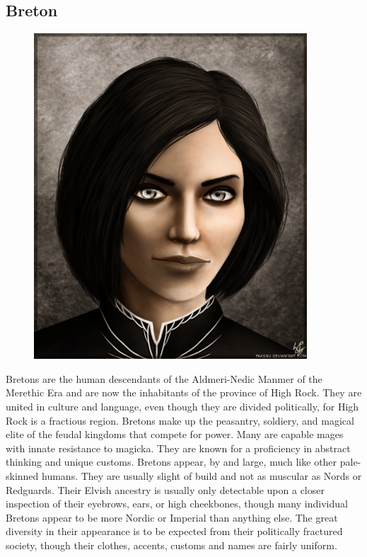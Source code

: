 \documentclass[12pt]{book}
\begin{document}
\subsection{Breton}
\begin{figure}
	\includegraphics[width=\textwidth]{Breton.png}
\end{figure}

Bretons are the human descendants of the Aldmeri-Nedic Manmer of the Merethic Era and are now the inhabitants of the province of High Rock. They are united in culture and language, even though they are divided politically, for High Rock is a fractious region. Bretons make up the peasantry, soldiery, and magical elite of the feudal kingdoms that compete for power. Many are capable mages with innate resistance to magicka. They are known for a proficiency in abstract thinking and unique customs. Bretons appear, by and large, much like other pale-skinned humans. They are usually slight of build and not as muscular as Nords or Redguards. Their Elvish ancestry is usually only detectable upon a closer inspection of their eyebrows, ears, or high cheekbones, though many individual Bretons appear to be more Nordic or Imperial than anything else. The great diversity in their appearance is to be expected from their politically fractured society, though their clothes, accents, customs and names are fairly uniform.
\end{document}
